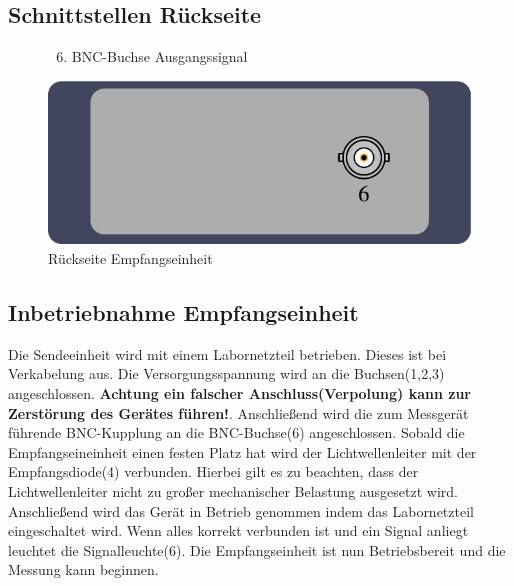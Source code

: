 \documentclass[10pt,a4paper]{scrartcl}
\begin{document}
\subsection{Schnittstellen Rückseite}
\begin{figure}[H]
\begin{minipage}[t]{6cm}
\vspace{0pt}
\begin{enumerate}
\setcounter{enumi}{5}
\item BNC-Buchse Ausgangssignal
\end{enumerate}
\end{minipage}
\hfill
\begin{minipage}[t]{6.5cm}
\vspace{0pt}
\includegraphics[scale=0.7]{gfx/rx-back.pdf}
\caption{Rückseite Empfangseinheit}
\label{fig:Bild4}
\end{minipage}
\end{figure}

\subsection{Inbetriebnahme Empfangseinheit}
Die Sendeeinheit wird mit einem Labornetzteil betrieben. Dieses ist bei Verkabelung aus.
Die Versorgungsspannung wird an die Buchsen(1,2,3) angeschlossen. \textbf{Achtung ein falscher Anschluss(Verpolung) kann zur Zerstörung des Gerätes führen!}. Anschließend wird die zum Messgerät führende BNC-Kupplung an die BNC-Buchse(6) angeschlossen. Sobald die Empfangseineinheit einen festen Platz hat wird der Lichtwellenleiter mit der Empfangsdiode(4) verbunden. Hierbei gilt es zu beachten, dass der Lichtwellenleiter nicht zu großer mechanischer Belastung ausgesetzt wird. Anschließend wird das Gerät in Betrieb genommen indem das Labornetzteil eingeschaltet wird. Wenn alles korrekt verbunden ist und ein Signal anliegt leuchtet die Signalleuchte(6).
Die Empfangseinheit ist nun Betriebsbereit und die Messung kann beginnen.
\end{document}
